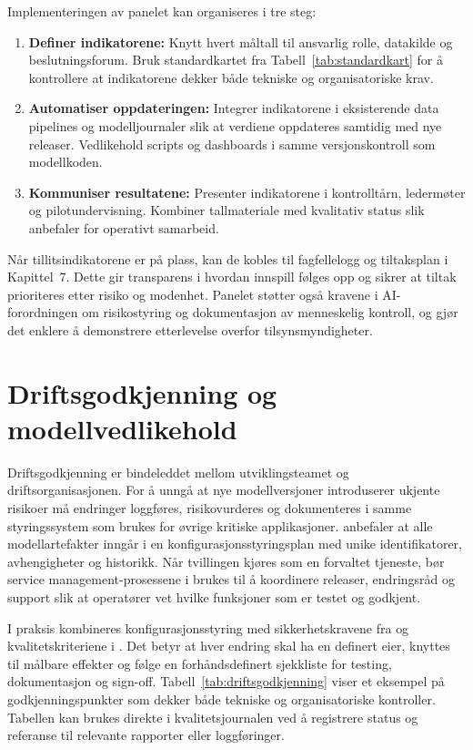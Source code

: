 Implementeringen av panelet kan organiseres i tre steg:
\begin{enumerate}
    \item \textbf{Definer indikatorene:} Knytt hvert måltall til ansvarlig rolle, datakilde og beslutningsforum. Bruk standardkartet fra Tabell~\ref{tab:standardkart} for å kontrollere at indikatorene dekker både tekniske og organisatoriske krav.
    \item \textbf{Automatiser oppdateringen:} Integrer indikatorene i eksisterende data pipelines og modelljournaler slik at verdiene oppdateres samtidig med nye releaser. Vedlikehold scripts og dashboards i samme versjonskontroll som modellkoden.
    \item \textbf{Kommuniser resultatene:} Presenter indikatorene i kontrolltårn, ledermøter og pilotundervisning. Kombiner tallmateriale med kvalitativ status slik \citet{statnett2024kontrolltarn} anbefaler for operativt samarbeid.
\end{enumerate}

Når tillitsindikatorene er på plass, kan de kobles til fagfellelogg og tiltaksplan i Kapittel~7. Dette gir transparens i hvordan innspill følges opp og sikrer at tiltak prioriteres etter risiko og modenhet. Panelet støtter også kravene i AI-forordningen om risikostyring og dokumentasjon av menneskelig kontroll, og gjør det enklere å demonstrere etterlevelse overfor tilsynsmyndigheter.

\section{Driftsgodkjenning og modellvedlikehold}
Driftsgodkjenning er bindeleddet mellom utviklingsteamet og driftsorganisasjonen. For å unngå at nye modellversjoner introduserer ukjente risikoer må endringer loggføres, risikovurderes og dokumenteres i samme styringssystem som brukes for øvrige kritiske applikasjoner. \citet{iso10007-2017} anbefaler at alle modellartefakter inngår i en konfigurasjonsstyringsplan med unike identifikatorer, avhengigheter og historikk. Når tvillingen kjøres som en forvaltet tjeneste, bør service management-prosessene i \citet{iso20000-1-2018} brukes til å koordinere releaser, endringsråd og support slik at operatører vet hvilke funksjoner som er testet og godkjent.

I praksis kombineres konfigurasjonsstyring med sikkerhetskravene fra \citet{nsm2023grunnprinsipper} og kvalitetskriteriene i \citet{dnv2023digitalassurance}. Det betyr at hver endring skal ha en definert eier, knyttes til målbare effekter og følge en forhåndsdefinert sjekkliste for testing, dokumentasjon og sign-off. Tabell~\ref{tab:driftsgodkjenning} viser et eksempel på godkjenningspunkter som dekker både tekniske og organisatoriske kontroller. Tabellen kan brukes direkte i kvalitetsjournalen ved å registrere status og referanse til relevante rapporter eller loggføringer.


